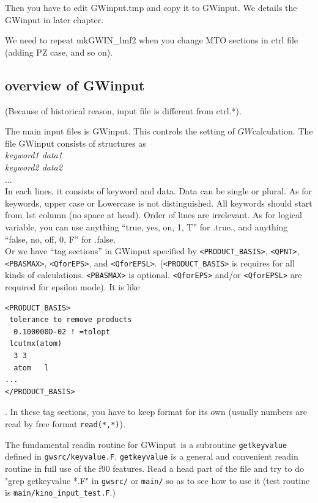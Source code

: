 \documentclass[a4paper,10pt,epsf,fleqn]{article}
\newcommand{\GW}{$GW$}
\newcommand{\GWinput}{{\sf GWinput}\ }
\newcommand{\io}[1]{{\sf  #1}\index{#1}}
\begin{document}
{Then you have to edit {\sf GWinput.tmp} and copy it to
{\sf GWinput}. We details the {\sf GWinput} in later chapter.

We need to repeat mkGWIN\_lmf2
when you change MTO sections in ctrl file (adding PZ case, and so on).


\subsection{overview of GWinput}
(Because of historical reason, input file is different from \io{ctrl.*}).

The main input files is {\sf GWinput}.
This controls the setting of \GW calculation.
The file {\sf GWinput} consists of
structures as\\
{\it keyword1 data1}\\
{\it keyword2 data2}\\
...\\
In each lines, it consists of keyword and data. 
Data can be single or plural.
As for keywords, upper case or Lowercase is not distinguished.
All keywords should start from 1st column (no space at head).
Order of lines are irrelevant.
As for logical variable, you can use 
anything ``true, yes, on, 1, T'' for .true.,
and anything ``false, no, off, 0, F'' for .false.\\

Or we have ``tag sections'' in {\sf GWinput} 
specified by \verb#<PRODUCT_BASIS>#, 
\verb#<QPNT>#,  \verb#<PBASMAX>#, \verb#<QforEPS>#, and \verb#<QforEPSL>#.
(\verb#<PRODUCT_BASIS># is requires for all kinds of calculations.
\verb#<PBASMAX># is optional. \verb#<QforEPS># and/or \verb#<QforEPSL># are required
for epsilon mode). It is like
\begin{verbatim}
<PRODUCT_BASIS>
 tolerance to remove products
  0.100000D-02 ! =tolopt
 lcutmx(atom) 
  3 3 
  atom   l
...
</PRODUCT_BASIS>
\end{verbatim}
. In these tag sections, you have to keep format for its own
(usually numbers are read by free format \verb#read(*,*)#).

The fundamental readin routine for \GWinput is a subroutine 
\verb#getkeyvalue# defined in \verb#gwsrc/keyvalue.F#.
\verb#getkeyvalue# is a general and convenient readin routine in full use of the f90 features.
Read a head part of the file and try to do "grep getkeyvalue *.F" 
in \verb#gwsrc/# or \verb#main/# so as to see how to use it
(test routine is \verb#main/kino_input_test.F#.)

}
\end{document}
